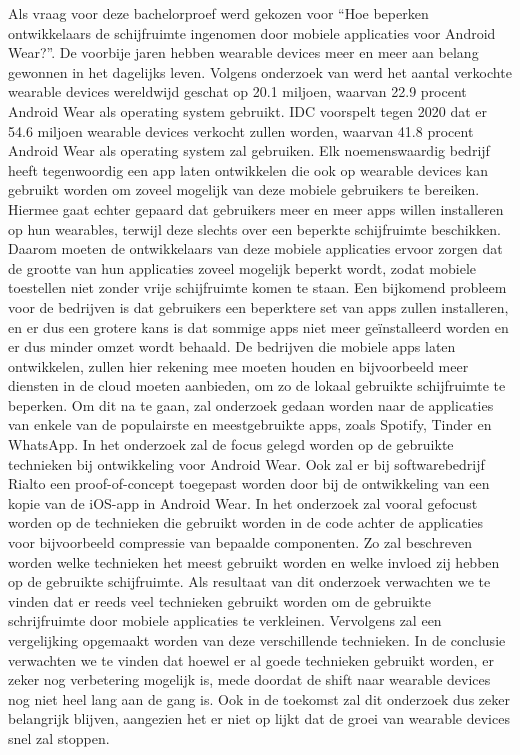 Als vraag voor deze bachelorproef werd gekozen voor “Hoe beperken ontwikkelaars de schijfruimte ingenomen door mobiele applicaties voor Android Wear?”. De voorbije jaren hebben wearable devices meer en meer aan belang gewonnen in het dagelijks leven. Volgens onderzoek van \textcite{idc} werd het aantal verkochte wearable devices wereldwijd geschat op 20.1 miljoen, waarvan 22.9 procent Android Wear als operating system gebruikt. IDC voorspelt tegen 2020 dat er 54.6 miljoen wearable devices verkocht zullen worden, waarvan 41.8 procent Android Wear als operating system zal gebruiken. Elk noemenswaardig bedrijf heeft tegenwoordig een app laten ontwikkelen die ook op wearable devices kan gebruikt worden om zoveel mogelijk van deze mobiele gebruikers te bereiken. Hiermee gaat echter gepaard dat gebruikers meer en meer apps willen installeren op hun wearables, terwijl deze slechts over een beperkte schijfruimte beschikken. Daarom moeten de ontwikkelaars van deze mobiele applicaties ervoor zorgen dat de grootte van hun applicaties zoveel mogelijk beperkt wordt, zodat mobiele toestellen niet zonder vrije schijfruimte komen te staan. Een bijkomend probleem voor de bedrijven is dat gebruikers een beperktere set van apps zullen installeren, en er dus een grotere kans is dat sommige apps niet meer geïnstalleerd worden en er dus minder omzet wordt behaald. De bedrijven die mobiele apps laten ontwikkelen, zullen hier rekening mee moeten houden en bijvoorbeeld meer diensten in de cloud moeten aanbieden, om zo de lokaal gebruikte schijfruimte te beperken. Om dit na te gaan, zal onderzoek gedaan worden naar de applicaties van enkele van de populairste en meestgebruikte apps, zoals Spotify, Tinder en WhatsApp. In het onderzoek zal de focus gelegd worden op de gebruikte technieken bij ontwikkeling voor Android Wear. Ook zal er bij softwarebedrijf Rialto een proof-of-concept toegepast worden door bij de ontwikkeling van een kopie van de iOS-app in Android Wear. In het onderzoek zal vooral gefocust worden op de technieken die gebruikt worden in de code achter de applicaties voor bijvoorbeeld compressie van bepaalde componenten. Zo zal beschreven worden welke technieken het meest gebruikt worden en welke invloed zij hebben op de gebruikte schijfruimte. Als resultaat van dit onderzoek verwachten we te vinden dat er reeds veel technieken gebruikt worden om de gebruikte schrijfruimte door mobiele applicaties te verkleinen. Vervolgens zal een vergelijking opgemaakt worden van deze verschillende technieken. In de conclusie verwachten we te vinden dat hoewel er al goede technieken gebruikt worden, er zeker nog verbetering mogelijk is, mede doordat de shift naar wearable devices nog niet heel lang aan de gang is. Ook in de toekomst zal dit onderzoek dus zeker belangrijk blijven, aangezien het er niet op lijkt dat de groei van wearable devices snel zal stoppen. 
